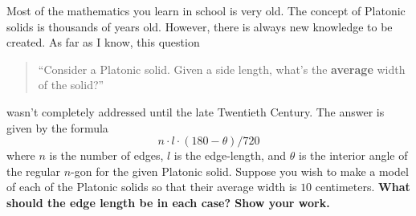 \documentclass[noauthor,nooutcomes,hints,handout]{ximera}
\begin{document}
\begin{question}
  Most of the mathematics you learn in school is very old. The concept
  of Platonic solids is thousands of years old. However, there is
  always new knowledge to be created. As far as I know, this question
  \begin{quote}
    ``Consider a Platonic solid. Given a side length, what's the
    \textbf{average} width of the solid?''
  \end{quote}
  wasn't completely addressed until the late Twentieth Century.
  The answer is given by the formula
  \[
  n \cdot l \cdot (180-\theta)/720
  \]
  where $n$ is the number of edges, $l$ is the edge-length, and
  $\theta$ is the interior angle of the regular $n$-gon for the given
  Platonic solid. Suppose you wish to make a model of each of the
  Platonic solids so that their average width is $10$
  centimeters. \textbf{What should the edge length be in each case? Show your
  work.}
\end{question}
\end{document}
